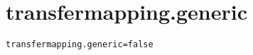 \section{transfermapping.generic}
\label{configuration:TransfermappingGeneric}
\ClearAPI
\TODO
{}
\begin{lstlisting}[style=Props,caption={Usage example for \textit{transfermapping.generic}}]
transfermapping.generic=false
\end{lstlisting}